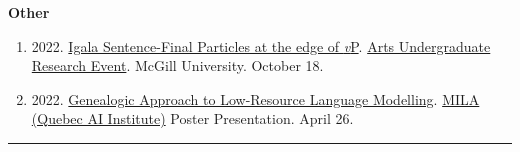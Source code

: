 \documentclass[margin,line]{resume}
\begin{document}
\begin{resume}
\begin{comment}
	\textbf{Reading Group \& Labs}
	\begin{enumerate}[-, leftmargin=1em, topsep=4pt]
		\item[] {2023. \href{https://mcling.blogs.mcgill.ca/2023/01/15/mull-lab-1-17-brandon-chaperon/}{A negative alternation: Negation head movement allomorphy in Igala}. \href{https://mull-lab.org/}{MULL Lab} meeting. McGill University. January 17.}

		\item[] {2022. \href{https://mcling.blogs.mcgill.ca/2022/03/27/mull-lab-03-30-brandon-chaperon/}{Igala's Dual Negation}. \href{https://mull-lab.org/}{MULL Lab} meeting. McGill University. March 30.}
	\end{enumerate}
\end{comment}

	\textbf{Other}
	\begin{enumerate}[-, leftmargin=1em, topsep=4pt]
		\item[] {2022. \href{https://www.mcgill.ca/arts-internships/files/arts-internships/brandon_chaperon.pdf}{Igala Sentence-Final Particles at the edge of \textit{v}P}. \href{https://www.mcgill.ca/arts-internships/events-0/#block-bean-annual-faculty-of-arts-undergrad}{Arts Undergraduate Research Event}. McGill University. October 18.}

		\item[] {2022. \href{https://github.com/peterzee-tsien/LING484-COMP599-Final-Projects/blob/main/484_Research_Poster.pdf}{Genealogic Approach to Low-Resource Language Modelling}. \href{https://mila.quebec/en/}{MILA (Quebec AI Institute)} Poster Presentation. April 26.}

	\end{enumerate}


	\vspace{-0.6em}\rule{\textwidth}{0.4pt}


	\begin{comment}
	\section{\mysidestyle Teaching}

	\href{https://www.mcgill.ca/study/2023-2024/courses/ling-410}{LING 410 - Structure of Wolof} undergraduate class for \href{https://inamartinovic.com/}{Martina Martinović}.\\
	McGill University.
	\hfill Feb 28 2024


\end{comment}
\end{resume}
\end{document}
